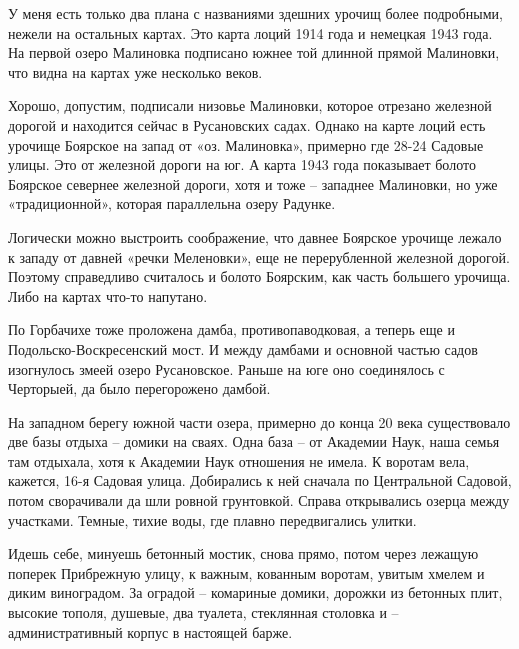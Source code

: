 
У меня есть только два плана с названиями здешних урочищ более подробными, нежели на остальных картах. Это карта лоций 1914 года и немецкая 1943 года. На первой озеро Малиновка подписано южнее той длинной прямой Малиновки, что видна на картах уже несколько веков. 

Хорошо, допустим, подписали низовье Малиновки, которое отрезано железной дорогой и находится сейчас в Русановских садах. Однако на карте лоций есть урочище Боярское на запад от «оз. Малиновка», примерно где 28-24 Садовые улицы. Это от железной дороги на юг. А карта 1943 года показывает болото Боярское севернее железной дороги, хотя и тоже – западнее Малиновки, но уже «традиционной», которая параллельна озеру Радунке.

Логически можно выстроить соображение, что давнее Боярское урочище лежало к западу от давней «речки Меленовки», еще не перерубленной железной дорогой. Поэтому справедливо считалось и болото Боярским, как часть большего урочища. Либо на картах что-то напутано.

По Горбачихе тоже проложена дамба, противопаводковая, а теперь еще и Подольско-Воскресенский мост. И между дамбами и основной частью садов изогнулось змеей озеро Русановское. Раньше на юге оно соединялось с Черторыей, да было перегорожено дамбой.

На западном берегу южной части озера, примерно до конца 20 века существовало две базы отдыха – домики на сваях. Одна база – от Академии Наук, наша семья там отдыхала, хотя к Академии Наук отношения не имела. К воротам вела, кажется, 16-я Садовая улица. Добирались к ней сначала по Центральной Садовой, потом сворачивали да шли ровной грунтовкой. Справа открывались озерца между участками. Темные, тихие воды, где плавно передвигались улитки.

Идешь себе, минуешь бетонный мостик, снова прямо, потом через лежащую поперек Прибрежную улицу, к важным, кованным воротам, увитым хмелем и диким виноградом. За оградой – комариные домики, дорожки из бетонных плит, высокие тополя, душевые, два туалета, стеклянная столовка и – административный корпус в настоящей барже.

